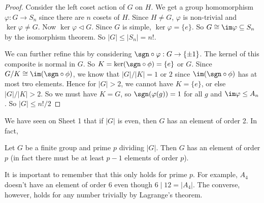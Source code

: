 \documentclass[a4paper]{article}
\begin{document}
\begin{proof}
  Consider the left coset action of $G$ on $H$. We get a group homomorphism $\varphi: G\to S_n$ since there are $n$ cosets of $H$. Since $H\not= G$, $\varphi$ is non-trivial and $\ker \varphi \not=G$. Now $\ker \varphi \lhd G$. Since $G$ is simple, $\ker\varphi = \{e\}$. So $G\cong \im \varphi \subseteq S_n$ by the isomorphism theorem. So $|G| \leq |S_n| = n!$.

  We can further refine this by considering $\sgn\circ \varphi: G \to \{\pm 1\}$. The kernel of this composite is normal in $G$. So $K = \ker(\sgn\circ\phi) = \{e\}$ or $G$. Since $G/K\cong \im (\sgn\circ\phi)$, we know that $|G|/|K| = 1$ or $2$ since $\im(\sgn\circ \phi)$ has at most two elements. Hence for $|G|> 2$, we cannot have $K = \{e\}$, or else $|G|/|K| > 2$. So we must have $K = G$, so $\sgn(\varphi(g)) = 1$ for all $g$ and $\im \varphi \leq A_n$. So $|G|\leq n!/2$
\end{proof}

We have seen on Sheet 1 that if $|G|$ is even, then $G$ has an element of order 2. In fact,
\begin{thm}
  Let $G$ be a finite group and prime $p$ dividing $|G|$. Then $G$ has an element of order $p$ (in fact there must be at least $p - 1$ elements of order $p$).
\end{thm}
It is important to remember that this only holds for prime $p$. For example, $A_4$ doesn't have an element of order $6$ even though $6 \mid 12 = |A_4|$. The converse, however, holds for any number trivially by Lagrange's theorem.
\end{document}
